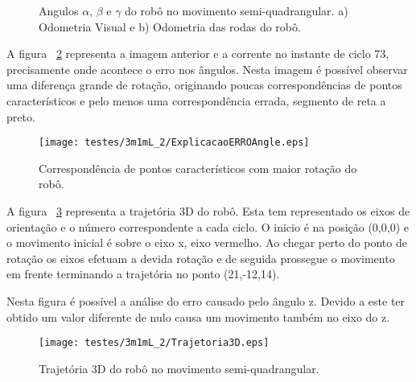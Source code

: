 \begin{figure}[h!]
	\centering
	\qquad
	\caption{Angulos $\alpha$, $\beta$ e $\gamma$ do robô  no movimento semi-quadrangular. a) Odometria Visual e b) Odometria das rodas do robô.}
	\label{fig:ang3m1mL_2}
\end{figure}

\pagebreak

A figura ~\ref{fig:ExplicAngErr3m1mL_2} representa a imagem anterior e a corrente no instante de ciclo 73, precisamente onde acontece o erro nos ângulos. Nesta imagem é possível observar uma diferença grande de rotação, originando poucas correspondências de pontos característicos e pelo menos uma correspondência errada, segmento de reta a preto.

\begin{figure}[h!]
	\begin{center}
		\leavevmode		
		\texttt{[image: testes/3m1mL\_2/ExplicacaoERROAngle.eps]}
		\caption{Correspondência de pontos característicos com maior rotação do robô.}
		\label{fig:ExplicAngErr3m1mL_2}
	\end{center}
\end{figure}


A figura ~\ref{fig:Traj3D3m1mL_2} representa a trajetória 3D do robô. Esta tem representado os eixos de orientação e o número correspondente a cada ciclo. O inicio é na posição (0,0,0) e o movimento inicial é sobre o eixo x, eixo vermelho. Ao chegar perto do ponto de rotação os eixos efetuam a devida rotação e de seguida prossegue o movimento em frente terminando a trajetória no ponto (21,-12,14). 

Nesta figura é possível a análise do erro causado pelo ângulo z. Devido a este ter obtido um valor diferente de nulo causa um movimento também no eixo do z.

\begin{figure}[h!]
	\begin{center}
		\leavevmode		
		\texttt{[image: testes/3m1mL\_2/Trajetoria3D.eps]}
		\caption{Trajetória 3D do robô no movimento semi-quadrangular.}
		\label{fig:Traj3D3m1mL_2}
	\end{center}
\end{figure}






